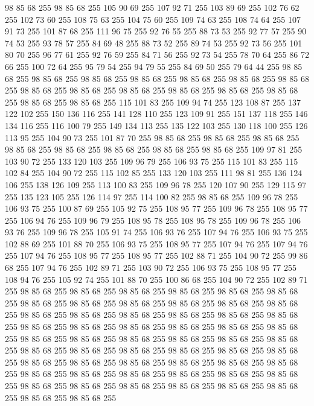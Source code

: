 98 85 68 255 98 85 68 255 105 90 69 255 107 92 71 255 103 89 69 255 102 76 62 255 102 73 60 255 108 75 63 255 104 75 60 255 109 74 63 255 108 74 64 255 107 91 73 255 101 87 68 255 111 96 75 255 92 76 55 255 88 73 53 255 92 77 57 255 90 74 53 255 93 78 57 255 84 69 48 255 88 73 52 255 89 74 53 255 92 73 56 255 101 80 70 255 96 77 61 255 92 76 59 255 84 71 56 255 92 73 54 255 78 70 64 255 86 72 66 255 100 72 64 255 95 79 54 255 94 79 55 255 84 69 50 255 79 64 44 255 98 85 68 255 98 85 68 255 98 85 68 255 98 85 68 255 98 85 68 255 98 85 68 255 98 85 68 255 98 85 68 255 98 85 68 255 98 85 68 255 98 85 68 255 98 85 68 255 98 85 68 255 98 85 68 255 98 85 68 255 115 101 83 255 109 94 74 255 123 108 87 255 137 122 102 255 150 136 116 255 141 128 110 255 123 109 91 255 151 137 118 255 146 134 116 255 116 100 79 255 149 134 113 255 135 122 103 255 130 118 100 255 126 113 95 255
104 90 73 255 101 87 70 255 98 85 68 255 98 85 68 255 98 85 68 255 98 85 68 255 98 85 68 255 98 85 68 255 98 85 68 255 98 85 68 255 109 97 81 255 103 90 72 255 133 120 103 255 109 96 79 255 106 93 75 255 115 101 83 255 115 102 84 255 104 90 72 255 115 102 85 255 133 120 103 255 111 98 81 255 136 124 106 255 138 126 109 255 113 100 83 255 109 96 78 255 120 107 90 255 129 115 97 255 135 123 105 255 126 114 97 255 114 100 82 255 98 85 68 255 109 96 78 255 106 93 75 255 100 87 69 255 105 92 75 255 108 95 77 255 109 96 78 255 108 95 77 255 106 94 76 255 109 96 79 255 108 95 78 255 108 95 78 255 109 96 78 255 106 93 76 255 109 96 78 255 105 91 74 255 106 93 76 255 107 94 76 255 106 93 75 255 102 88 69 255 101 88 70 255 106 93 75 255 108 95 77 255 107 94 76 255 107 94 76 255 107 94 76 255 108 95 77 255 108 95 77 255 102 88 71 255 104 90 72 255 99 86 68 255 107 94 76 255 102 89 71 255 103 90 72 255
106 93 75 255 108 95 77 255 108 94 76 255 105 92 74 255 101 88 70 255 100 86 68 255 104 90 72 255 102 89 71 255 98 85 68 255 98 85 68 255 98 85 68 255 98 85 68 255 98 85 68 255 98 85 68 255 98 85 68 255 98 85 68 255 98 85 68 255 98 85 68 255 98 85 68 255 98 85 68 255 98 85 68 255 98 85 68 255 98 85 68 255 98 85 68 255 98 85 68 255 98 85 68 255 98 85 68 255 98 85 68 255 98 85 68 255 98 85 68 255 98 85 68 255 98 85 68 255 98 85 68 255 98 85 68 255 98 85 68 255 98 85 68 255 98 85 68 255 98 85 68 255 98 85 68 255 98 85 68 255 98 85 68 255 98 85 68 255 98 85 68 255 98 85 68 255 98 85 68 255 98 85 68 255 98 85 68 255 98 85 68 255 98 85 68 255 98 85 68 255 98 85 68 255 98 85 68 255 98 85 68 255 98 85 68 255 98 85 68 255 98 85 68 255 98 85 68 255 98 85 68 255 98 85 68 255 98 85 68 255 98 85 68 255 98 85 68 255 98 85 68 255 98 85 68 255
